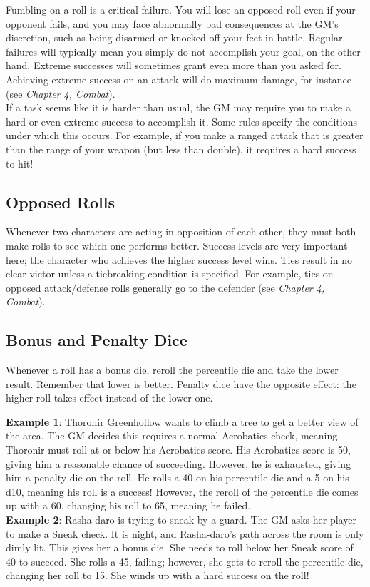 \documentclass[12pt]{book}
\begin{document}
Fumbling on a roll is a critical failure. You will lose an opposed roll even if your opponent fails, and you may face abnormally bad consequences at the GM's discretion, such as being disarmed or knocked off your feet in battle. Regular failures will typically mean you simply do not accomplish your goal, on the other hand. Extreme successes will sometimes grant even more than you asked for. Achieving extreme success on an attack will do maximum damage, for instance (see \textit{Chapter 4, Combat}).\\

If a task seems like it is harder than usual, the GM may require you to make a hard or even extreme success to accomplish it. Some rules specify the conditions under which this occurs. For example, if you make a ranged attack that is greater than the range of your weapon (but less than double), it requires a hard success to hit!

\subsection{Opposed Rolls}
Whenever two characters are acting in opposition of each other, they must both make rolls to see which one performs better. Success levels are very important here; the character who achieves the higher success level wins. Ties result in no clear victor unless a tiebreaking condition is specified. For example, ties on opposed attack/defense rolls generally go to the defender (see \textit{Chapter 4, Combat}).

\subsection{Bonus and Penalty Dice}
Whenever a roll has a bonus die, reroll the percentile die and take the lower result. Remember that lower is better. Penalty dice have the opposite effect: the higher roll takes effect instead of the lower one.\\

\begin{tcolorbox}
\textbf{Example 1}: Thoronir Greenhollow wants to climb a tree to get a better view of the area. The GM decides this requires a normal Acrobatics check, meaning Thoronir must roll at or below his Acrobatics score. His Acrobatics score is 50, giving him a reasonable chance of succeeding. However, he is exhausted, giving him a penalty die on the roll. He rolls a 40 on his percentile die and a 5 on his d10, meaning his roll is a success! However, the reroll of the percentile die comes up with a 60, changing his roll to 65, meaning he failed.\\

\textbf{Example 2}: Rasha-daro is trying to sneak by a guard. The GM asks her player to make a Sneak check. It is night, and Rasha-daro's path across the room is only dimly lit. This gives her a bonus die. She needs to roll below her Sneak score of 40 to succeed. She rolls a 45, failing; however, she gets to reroll the percentile die, changing her roll to 15. She winds up with a hard success on the roll!
\end{tcolorbox}
\end{document}
